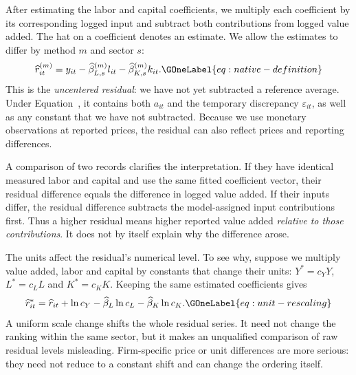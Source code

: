 After estimating the labor and capital coefficients, we multiply each coefficient by its corresponding logged input and subtract both contributions from logged value added. The hat on a coefficient denotes an estimate. We allow the estimates to differ by method $m$ and sector $s$:
\begin{equation}
\widehat r_{it}^{(m)}=y_{it}-\widehat\beta_{L,s}^{(m)}l_{it}-\widehat\beta_{K,s}^{(m)}k_{it}.
\GOneLabel{eq:native-definition}
\end{equation}
This is the \emph{uncentered residual}: we have not yet subtracted a reference average. Under Equation~, it contains both $a_{it}$ and the temporary discrepancy $\varepsilon_{it}$, as well as any constant that we have not subtracted. Because we use monetary observations at reported prices, the residual can also reflect prices and reporting differences.

A comparison of two records clarifies the interpretation. If they have identical measured labor and capital and use the same fitted coefficient vector, their residual difference equals the difference in logged value added. If their inputs differ, the residual difference subtracts the model-assigned input contributions first. Thus a higher residual means higher reported value added \emph{relative to those contributions}. It does not by itself explain why the difference arose.

The units affect the residual's numerical level. To see why, suppose we multiply value added, labor and capital by constants that change their units: $Y^*=c_YY$, $L^*=c_LL$ and $K^*=c_KK$. Keeping the same estimated coefficients gives
\begin{equation}
\widehat r^*_{it}=\widehat r_{it}+\ln c_Y-\widehat\beta_L\ln c_L-\widehat\beta_K\ln c_K.
\GOneLabel{eq:unit-rescaling}
\end{equation}
A uniform scale change shifts the whole residual series. It need not change the ranking within the same sector, but it makes an unqualified comparison of raw residual levels misleading. Firm-specific price or unit differences are more serious: they need not reduce to a constant shift and can change the ordering itself.

